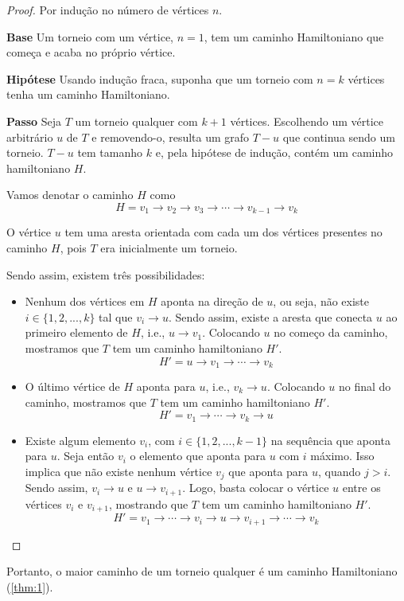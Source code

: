 \documentclass[11pt]{article}
\begin{document}
    \begin{proof}
        Por indução no número de vértices $n$.
        
        \textbf{Base} Um torneio com um vértice, $n=1$, tem um caminho Hamiltoniano que começa e acaba no próprio vértice.
        
        \textbf{Hipótese} Usando indução fraca, suponha que um torneio com $n=k$ vértices tenha um caminho Hamiltoniano.
        
        \textbf{Passo} Seja $T$ um torneio qualquer com $k+1$ vértices. Escolhendo um vértice arbitrário $u$ de $T$ e removendo-o, resulta um grafo $T-u$ que continua sendo um torneio. $T-u$ tem tamanho $k$ e, pela hipótese de indução, contém  um caminho hamiltoniano $H$.
        
        Vamos denotar o caminho $H$ como
        $$H = v_1\to v_2\to v_3\to \cdots \to v_{k-1}\to v_k$$
        
        O vértice $u$ tem uma aresta orientada com cada um dos vértices presentes no caminho $H$, pois $T$ era inicialmente um torneio.
        
        Sendo assim, existem três possibilidades:
        \begin{itemize}
            \item Nenhum dos vértices em $H$ aponta na direção de $u$, ou seja, não existe $i\in\{1,2,...,k\}$ tal que $v_i\to u$. Sendo assim, existe a aresta que conecta $u$ ao primeiro elemento de $H$, i.e., $u\to v_1$. Colocando $u$ no começo da caminho, mostramos que $T$ tem um caminho hamiltoniano $H'$.
        $$H' = u\to v_1 \to \cdots \to v_k$$
        \item O último vértice de $H$ aponta para $u$, i.e., $v_k\to u$. Colocando $u$ no final do caminho, mostramos que $T$ tem um caminho hamiltoniano $H'$.
        $$H' = v_1 \to \cdots \to v_k \to u$$
        \item Existe algum elemento $v_i$, com $i\in \{1,2,...,k-1\}$ na sequência que aponta para $u$. Seja então $v_i$ o elemento que aponta para $u$ com $i$ máximo. Isso implica que não existe nenhum vértice $v_j$ que aponta para $u$, quando $j > i$. Sendo assim, $v_i \to u$ e $u \to v_{i+1}$. Logo, basta colocar o vértice $u$ entre os vértices $v_i$ e $v_{i+1}$, mostrando que $T$ tem um caminho hamiltoniano $H'$.
        $$H' = v_1\to \cdots \to v_i \to u \to v_{i+1} \to \cdots \to v_k$$ 
        \end{itemize}
    \end{proof}

    Portanto, o maior caminho de um torneio qualquer é um caminho Hamiltoniano (\cref{thm:1}).
\end{document}
